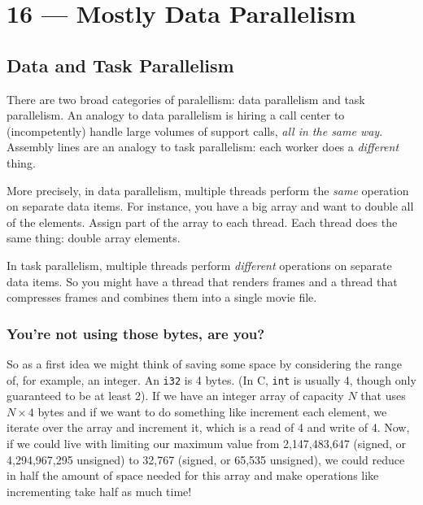 \documentclass[a4paper]{report}
\begin{document}
\chapter*{16 --- Mostly Data Parallelism}



\section*{Data and Task Parallelism}
There are two broad categories of paralellism: data parallelism and
task parallelism. An analogy to data parallelism is hiring a call
center to (incompetently) handle large volumes of support calls,
\emph{all in the same way}. Assembly lines are an analogy to task
parallelism: each worker does a \emph{different} thing.

More precisely, in data parallelism, multiple threads perform the
\emph{same} operation on separate data items. For instance, you have a
big array and want to double all of the elements. Assign part of the
array to each thread. Each thread does the same thing: double array
elements.

In task parallelism, multiple threads perform \emph{different}
operations on separate data items. So you might have a thread that
renders frames and a thread that compresses frames and combines them
into a single movie file.


\subsection*{You're not using those bytes, are you?}
So as a first idea we might think of saving some space by considering the range of, for example, an integer. An \texttt{i32} is 4 bytes. (In C, \texttt{int} is usually 4, though only guaranteed to be at least 2). If we have an integer array of capacity $N$ that uses $N \times 4$ bytes and if we want to do something like increment each element, we iterate over the array and increment it, which is a read of 4 and write of 4. Now, if we could live with limiting our maximum value from 2,147,483,647 (signed, or 4,294,967,295 unsigned) to 32,767  (signed, or 65,535 unsigned), we could reduce in half the amount of space needed for this array and make operations like incrementing take half as much time!
\end{document}
